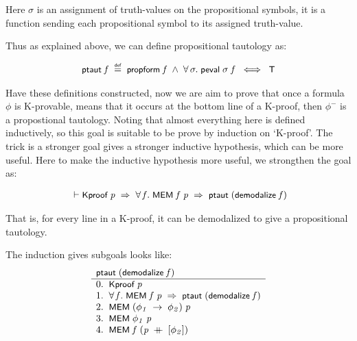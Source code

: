 \documentclass{report}
\renewcommand{\HOLConst}[1]{{\textsf{\upshape\small #1}}}
\renewcommand{\HOLinline}[1]{\ensuremath{#1}}
\newenvironment{holmath}{\begin{displaymath}\begin{array}{l}}{\end{array}\end{displaymath}\ignorespacesafterend}
\begin{document}
Here $\sigma$ is an assignment of truth-values on the propositional symbols, it is a function sending each propositional symbol to its assigned truth-value.

Thus as explained above, we can define propositional tautology as:

\begin{holmath}
  \HOLConst{ptaut}\;\HOLFreeVar{f}\;\HOLSymConst{\HOLTokenDefEquality{}}\;\HOLConst{propform}\;\HOLFreeVar{f}\;\HOLSymConst{\HOLTokenConj{}}\;\HOLSymConst{\HOLTokenForall{}}\HOLBoundVar{\ensuremath{\sigma}}.\;\HOLConst{peval}\;\HOLBoundVar{\ensuremath{\sigma}}\;\HOLFreeVar{f}\;\HOLSymConst{\HOLTokenEquiv{}}\;\HOLConst{T}
\end{holmath}

Have these definitions constructed, now we are aim to prove that once a formula $\phi$ is K-provable, means that it occurs at the bottom line of a K-proof, then $\phi^-$ is a propostional tautology. Noting that almost everything here is defined inductively, so this goal is suitable to be prove by induction on `K-proof'. The trick is a stronger goal gives a stronger inductive hypothesis, which can be more useful. Here to make the inductive hypothesis more useful, we strongthen the goal as:

\begin{holmath}
  \ensuremath{\HOLTokenTurnstile}\HOLConst{Kproof}\;\HOLFreeVar{p}\;\HOLSymConst{\HOLTokenImp{}}\;\HOLSymConst{\HOLTokenForall{}}\HOLBoundVar{f}.\;\HOLConst{MEM}\;\HOLBoundVar{f}\;\HOLFreeVar{p}\;\HOLSymConst{\HOLTokenImp{}}\;\HOLConst{ptaut}\;(\HOLConst{demodalize}\;\HOLBoundVar{f})
\end{holmath}

That is, for every line in a K-proof, it can be demodalized to give a propositional tautology.

The induction gives subgoals looks like:
\[
\begin{array}{l}
\HOLinline{\HOLConst{ptaut}\;(\HOLConst{demodalize}\;\HOLFreeVar{f})}\\ \hline
0. \;\;\HOLinline{\HOLConst{Kproof}\;\HOLFreeVar{p}}\\
1. \;\;\HOLinline{\HOLSymConst{\HOLTokenForall{}}\HOLBoundVar{f}.\;\HOLConst{MEM}\;\HOLBoundVar{f}\;\HOLFreeVar{p}\;\HOLSymConst{\HOLTokenImp{}}\;\HOLConst{ptaut}\;(\HOLConst{demodalize}\;\HOLBoundVar{f})}\\
2. \;\;\HOLinline{\HOLConst{MEM}\;(\HOLFreeVar{\ensuremath{\phi\sb{1}}}\;\HOLSymConst{\ensuremath{\rightarrow}}\;\HOLFreeVar{\ensuremath{\phi\sb{2}}})\;\HOLFreeVar{p}}\\
3. \;\;\HOLinline{\HOLConst{MEM}\;\HOLFreeVar{\ensuremath{\phi\sb{1}}}\;\HOLFreeVar{p}}\\
4. \;\;\HOLinline{\HOLConst{MEM}\;\HOLFreeVar{f}\;(\HOLFreeVar{p}\;\HOLSymConst{\HOLTokenDoublePlus}\;[\HOLFreeVar{\ensuremath{\phi\sb{2}}}])}
\end{array}
\]
\end{document}
